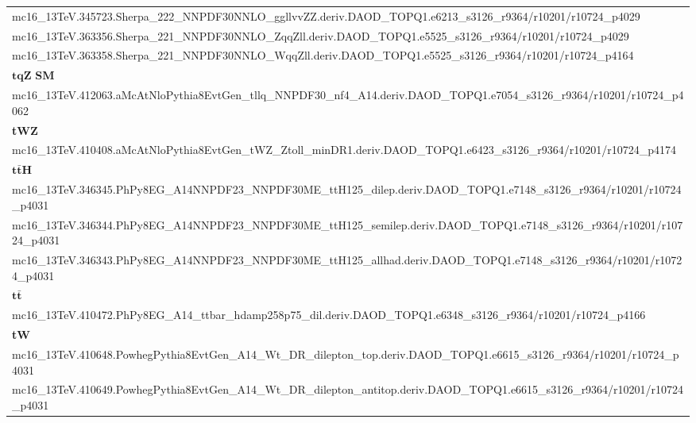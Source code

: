 \begin{table}[htbp]
\begin{adjustwidth}{-0.6cm}{}
\begin{tabular}{l}
			mc16\_13TeV.345723.Sherpa\_222\_NNPDF30NNLO\_ggllvvZZ.deriv.DAOD\_TOPQ1.e6213\_s3126\_r9364/r10201/r10724\_p4029 \\
			mc16\_13TeV.363356.Sherpa\_221\_NNPDF30NNLO\_ZqqZll.deriv.DAOD\_TOPQ1.e5525\_s3126\_r9364/r10201/r10724\_p4029 \\
			mc16\_13TeV.363358.Sherpa\_221\_NNPDF30NNLO\_WqqZll.deriv.DAOD\_TOPQ1.e5525\_s3126\_r9364/r10201/r10724\_p4164 \\
			\hline
			$\mathbf{tqZ}$ \textbf{SM} \\
			\hline
			mc16\_13TeV.412063.aMcAtNloPythia8EvtGen\_tllq\_NNPDF30\_nf4\_A14.deriv.DAOD\_TOPQ1.e7054\_s3126\_r9364/r10201/r10724\_p4062 \\
			\hline
			\textbf{tWZ} \\
			\hline
			mc16\_13TeV.410408.aMcAtNloPythia8EvtGen\_tWZ\_Ztoll\_minDR1.deriv.DAOD\_TOPQ1.e6423\_s3126\_r9364/r10201/r10724\_p4174 \\
			\hline
			$\mathbf{t\bar{t}H}$ \\
			\hline
			mc16\_13TeV.346345.PhPy8EG\_A14NNPDF23\_NNPDF30ME\_ttH125\_dilep.deriv.DAOD\_TOPQ1.e7148\_s3126\_r9364/r10201/r10724\_p4031 \\
			mc16\_13TeV.346344.PhPy8EG\_A14NNPDF23\_NNPDF30ME\_ttH125\_semilep.deriv.DAOD\_TOPQ1.e7148\_s3126\_r9364/r10201/r10724\_p4031 \\
			mc16\_13TeV.346343.PhPy8EG\_A14NNPDF23\_NNPDF30ME\_ttH125\_allhad.deriv.DAOD\_TOPQ1.e7148\_s3126\_r9364/r10201/r10724\_p4031 \\	
			\hline
			$\mathbf{t\bar{t}}$ \\
			\hline
			mc16\_13TeV.410472.PhPy8EG\_A14\_ttbar\_hdamp258p75\_dil.deriv.DAOD\_TOPQ1.e6348\_s3126\_r9364/r10201/r10724\_p4166 \\
			\hline
			\textbf{tW} \\
			\hline
			mc16\_13TeV.410648.PowhegPythia8EvtGen\_A14\_Wt\_DR\_dilepton\_top.deriv.DAOD\_TOPQ1.e6615\_s3126\_r9364/r10201/r10724\_p4031 \\
			mc16\_13TeV.410649.PowhegPythia8EvtGen\_A14\_Wt\_DR\_dilepton\_antitop.deriv.DAOD\_TOPQ1.e6615\_s3126\_r9364/r10201/r10724\_p4031 \\

\end{tabular}
\end{adjustwidth}
\end{table}
